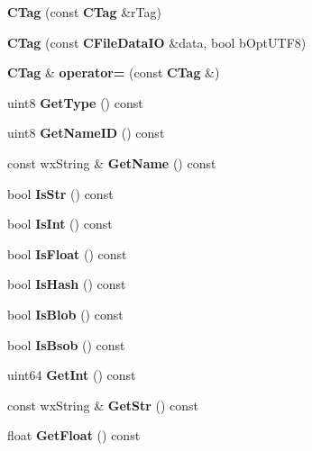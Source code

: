 \begin{DoxyCompactItemize}
\item 
{\bfseries CTag} (const {\bf CTag} \&rTag)\label{classCTag_aba4f28afbd560a765213de276a53d100}

\item 
{\bfseries CTag} (const {\bf CFileDataIO} \&data, bool bOptUTF8)\label{classCTag_a8e0d8694a6957073859d0455a451e3f1}

\item 
{\bf CTag} \& {\bfseries operator=} (const {\bf CTag} \&)\label{classCTag_abefca45d175f3c22c0c6ac5648923681}

\item 
uint8 {\bfseries GetType} () const \label{classCTag_a5664e6b18b35f8abbd358a3b54ed3b81}

\item 
uint8 {\bfseries GetNameID} () const \label{classCTag_af89158120be977b1180c19291df60e5e}

\item 
const wxString \& {\bfseries GetName} () const \label{classCTag_a68d80411b18f1669734c8df6f7710f56}

\item 
bool {\bfseries IsStr} () const \label{classCTag_a42552c8c7cbd22124adba3b1184c4bc5}

\item 
bool {\bfseries IsInt} () const \label{classCTag_aa35bd07dde6f73988df1229454f64e06}

\item 
bool {\bfseries IsFloat} () const \label{classCTag_a114f9771c00b34d56df97c430fe89aa3}

\item 
bool {\bfseries IsHash} () const \label{classCTag_a528c69df6bf5759098e50ae17f2ab9ec}

\item 
bool {\bfseries IsBlob} () const \label{classCTag_a99ef67d8239f0c7d3efa48d4dbe6eb46}

\item 
bool {\bfseries IsBsob} () const \label{classCTag_a0051234a7235aac35568f1c5cfc6e0aa}

\item 
uint64 {\bfseries GetInt} () const \label{classCTag_a3db6dcdec105b950139c19cf8ec1f92a}

\item 
const wxString \& {\bfseries GetStr} () const \label{classCTag_a5d1c25833bff165483abcb71026e06f3}

\item 
float {\bfseries GetFloat} () const \label{classCTag_a4a897ae1d818892409f776953aa33576}


\end{DoxyCompactItemize}
